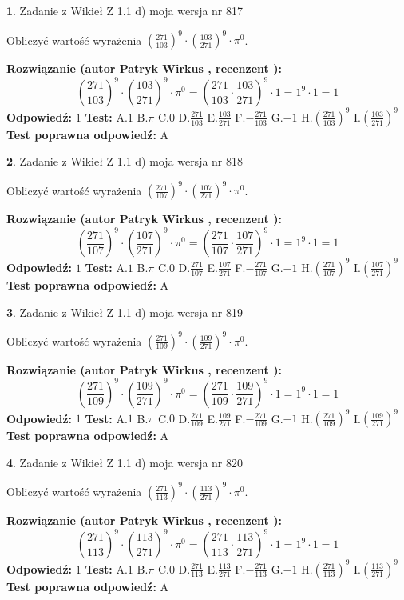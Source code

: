 \documentclass[12pt, a4paper]{article}
\theoremstyle{definition} %
\newtheorem{zad}{}
\newcommand{\zadStart}[1]{\begin{zad}#1\newline}
\newcommand{\zadStop}{\end{zad}}
\newcommand{\rozwStart}[2]{\noindent \textbf{Rozwiązanie (autor #1 , recenzent #2): }\newline}
\newcommand{\rozwStop}{\newline}
\newcommand{\odpStart}{\noindent \textbf{Odpowiedź:}\newline}
\newcommand{\odpStop}{\newline}
\newcommand{\testStart}{\noindent \textbf{Test:}\newline}
\newcommand{\testStop}{\newline}
\newcommand{\kluczStart}{\noindent \textbf{Test poprawna odpowiedź:}\newline}
\newcommand{\kluczStop}{\newline}
\begin{document}
\zadStart{Zadanie z Wikieł Z 1.1 d) moja wersja nr 817}

Obliczyć wartość wyrażenia $(\frac{271}{103})^{9} \cdot (\frac{103}{271})^{9} \cdot \pi^{0}$.
\zadStop
\rozwStart{Patryk Wirkus}{}
$$(\frac{271}{103})^{9} \cdot (\frac{103}{271})^{9} \cdot \pi^{0} = (\frac{271}{103} \cdot \frac{103}{271})^{9} \cdot 1 = 1^{9} \cdot 1 = 1$$
\rozwStop
\odpStart
$1$
\odpStop
\testStart
A.$1$ B.$\pi$ C.$0$ D.$\frac{271}{103}$ E.$\frac{103}{271}$
F.$-\frac{271}{103}$ G.$-1$
H.$(\frac{271}{103})^{9}$
I.$(\frac{103}{271})^{9}$
\testStop
\kluczStart
A
\kluczStop



\zadStart{Zadanie z Wikieł Z 1.1 d) moja wersja nr 818}

Obliczyć wartość wyrażenia $(\frac{271}{107})^{9} \cdot (\frac{107}{271})^{9} \cdot \pi^{0}$.
\zadStop
\rozwStart{Patryk Wirkus}{}
$$(\frac{271}{107})^{9} \cdot (\frac{107}{271})^{9} \cdot \pi^{0} = (\frac{271}{107} \cdot \frac{107}{271})^{9} \cdot 1 = 1^{9} \cdot 1 = 1$$
\rozwStop
\odpStart
$1$
\odpStop
\testStart
A.$1$ B.$\pi$ C.$0$ D.$\frac{271}{107}$ E.$\frac{107}{271}$
F.$-\frac{271}{107}$ G.$-1$
H.$(\frac{271}{107})^{9}$
I.$(\frac{107}{271})^{9}$
\testStop
\kluczStart
A
\kluczStop



\zadStart{Zadanie z Wikieł Z 1.1 d) moja wersja nr 819}

Obliczyć wartość wyrażenia $(\frac{271}{109})^{9} \cdot (\frac{109}{271})^{9} \cdot \pi^{0}$.
\zadStop
\rozwStart{Patryk Wirkus}{}
$$(\frac{271}{109})^{9} \cdot (\frac{109}{271})^{9} \cdot \pi^{0} = (\frac{271}{109} \cdot \frac{109}{271})^{9} \cdot 1 = 1^{9} \cdot 1 = 1$$
\rozwStop
\odpStart
$1$
\odpStop
\testStart
A.$1$ B.$\pi$ C.$0$ D.$\frac{271}{109}$ E.$\frac{109}{271}$
F.$-\frac{271}{109}$ G.$-1$
H.$(\frac{271}{109})^{9}$
I.$(\frac{109}{271})^{9}$
\testStop
\kluczStart
A
\kluczStop



\zadStart{Zadanie z Wikieł Z 1.1 d) moja wersja nr 820}

Obliczyć wartość wyrażenia $(\frac{271}{113})^{9} \cdot (\frac{113}{271})^{9} \cdot \pi^{0}$.
\zadStop
\rozwStart{Patryk Wirkus}{}
$$(\frac{271}{113})^{9} \cdot (\frac{113}{271})^{9} \cdot \pi^{0} = (\frac{271}{113} \cdot \frac{113}{271})^{9} \cdot 1 = 1^{9} \cdot 1 = 1$$
\rozwStop
\odpStart
$1$
\odpStop
\testStart
A.$1$ B.$\pi$ C.$0$ D.$\frac{271}{113}$ E.$\frac{113}{271}$
F.$-\frac{271}{113}$ G.$-1$
H.$(\frac{271}{113})^{9}$
I.$(\frac{113}{271})^{9}$
\testStop
\kluczStart
A
\kluczStop
\end{document}
